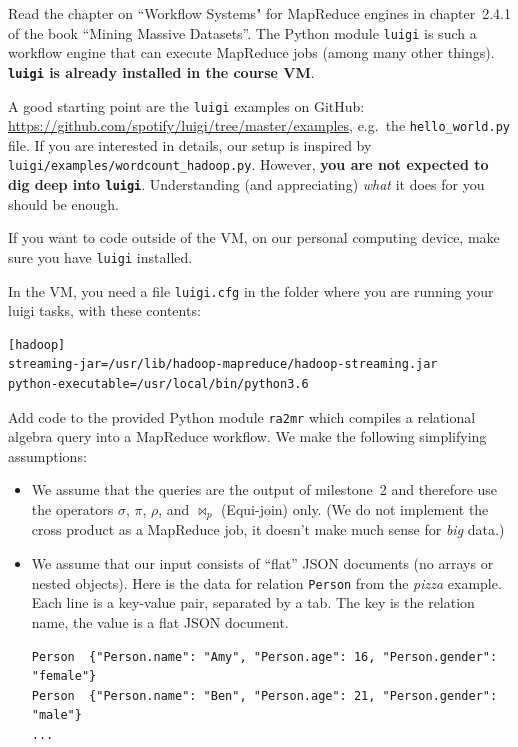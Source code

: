 \documentclass[12pt]{exam}
\begin{document}
\begin{questions}

\question
Read the chapter on ``Workflow Systems" for MapReduce engines in chapter~2.4.1
of the book ``Mining Massive Datasets''. The Python module \verb!luigi! is such a workflow engine that can execute MapReduce jobs (among many other things). {\bf \verb!luigi! is already installed in the course VM}.

A good starting point are the \verb!luigi! examples on GitHub: \url{https://github.com/spotify/luigi/tree/master/examples}, e.g.\ the \verb!hello_world.py! file.
%
If you are interested in details, our setup is inspired by \verb!luigi/examples/wordcount_hadoop.py!. However, {\bf you are not expected to dig deep into \verb!luigi!}. Understanding (and appreciating) {\em what}\/ it does for you should be enough.

If you want to code outside of the VM, on our personal computing device, make sure you have \verb!luigi! installed. 


\question 
In the VM, you need a file \verb!luigi.cfg! in the folder where you are running your luigi tasks, with these contents:  
\begin{Verbatim}[frame=single,fontsize=\small]
[hadoop]
streaming-jar=/usr/lib/hadoop-mapreduce/hadoop-streaming.jar
python-executable=/usr/local/bin/python3.6
\end{Verbatim}


\question Add code to the provided Python module \verb!ra2mr! which compiles a relational algebra query into a MapReduce workflow. We make the following simplifying assumptions:

\begin{itemize}
    \item 

We assume that the queries are the output of milestone~2 and therefore use the operators $\sigma$, $\pi$, $\rho$, and $\bowtie_p$ (Equi-join) only. (We do not implement the cross product as a MapReduce job, it doesn't make much sense for {\em big}\/ data.)

\item
We assume that our input consists of ``flat'' JSON documents (no arrays or  nested objects). Here is the data for  relation \verb!Person! from the {\em pizza}\/ example. Each line is a key-value pair, separated by a tab. The key is the relation name, the value is a flat JSON document.

\begin{Verbatim}[frame=single,fontsize=\scriptsize]
Person	{"Person.name": "Amy", "Person.age": 16, "Person.gender": "female"}
Person	{"Person.name": "Ben", "Person.age": 21, "Person.gender": "male"}
...
\end{Verbatim}



\end{itemize}
\end{questions}
\end{document}

